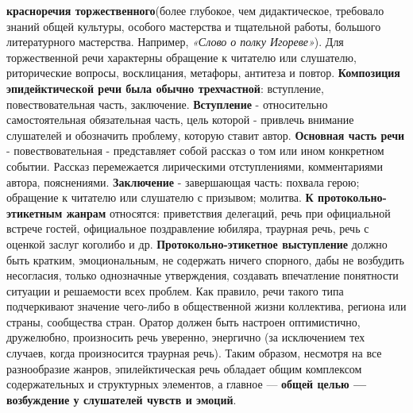 \textbf{красноречия торжественного}(более глубокое, чем дидактическое, требовало знаний общей культуры, особого мастерства и тщательной работы, большого литературного мастерства. Например, \textit{«Слово о полку Игореве»}). Для торжественной речи характерны обращение к читателю или слушателю, риторические вопросы, восклицания, метафоры, антитеза и повтор. \textbf{Композиция эпидейктической речи была обычно трехчастной}: вступление, повествовательная часть, заключение. \textbf{Вступление} - относительно самостоятельная обязательная часть, цель которой - привлечь внимание слушателей и обозначить проблему, которую ставит автор. \textbf{Основная часть речи} - повествовательная - представляет собой рассказ о том или ином конкретном событии. Рассказ перемежается лирическими отступлениями, комментариями автора, пояснениями. \textbf{Заключение} - завершающая часть: похвала герою; обращение к читателю или слушателю с призывом; молитва.\textbf{ К протокольно-этикетным жанрам} относятся: приветствия делегаций, речь при официальной встрече гостей, официальное поздравление юбиляра, траурная речь, речь с оценкой заслуг коголибо и др. \textbf{Протокольно-этикетное выступление} должно быть кратким, эмоциональным, не содержать ничего спорного, дабы не возбудить несогласия, только однозначные утверждения, создавать впечатление понятности ситуации и решаемости всех проблем. Как правило, речи такого типа подчеркивают значение чего-либо в общественной жизни коллектива, региона или страны, сообщества стран. Оратор должен быть настроен оптимистично, дружелюбно, произносить речь уверенно, энергично (за исключением тех случаев, когда произносится траурная речь). Таким образом, несмотря на все разнообразие жанров, эпилейктическая речь обладает общим комплексом содержательных и структурных элементов, а главное — \textbf{общей целью — возбуждение у слушателей чувств и эмоций}. 
